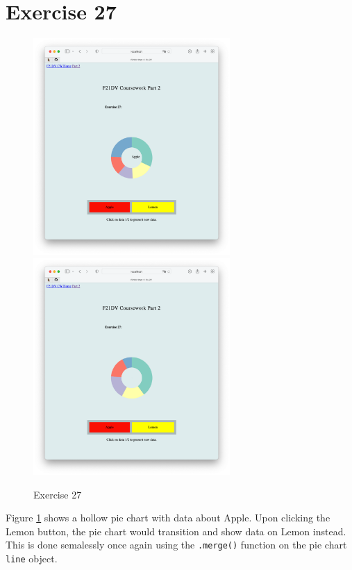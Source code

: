 \documentclass{scrreprt}
\begin{document}
\newpage
\section{Exercise 27}
\begin{figure}[!ht]
    \centering
    \includegraphics[width = 7.5cm]{images/ex27_1.png}
    \includegraphics[width = 7.5cm]{images/ex27_2.png}
    \label{fig:ex27}
    \caption{Exercise 27}
\end{figure}
\FloatBarrier
% 
Figure \ref{fig:ex27} shows a hollow pie chart with data about Apple. Upon clicking the Lemon button, the pie chart would transition and show data on Lemon instead. This is done semalessly once again using the \verb|.merge()| function on the pie chart \verb|line| object.

\newpage
\end{document}
